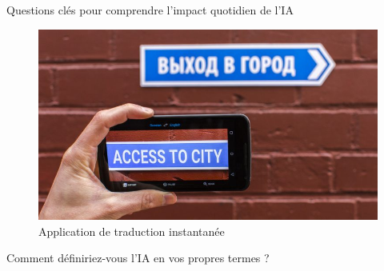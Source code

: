 \documentclass{beamer}
\begin{document}
\begin{frame}{Questions clés pour comprendre l'impact quotidien de l'IA}
\begin{figure}[h]
\begin{minipage}{0.4\textwidth}
				\caption{Resultat de recherche personalisée}
			\end{minipage}\hfill
			\begin{minipage}{0.32\textwidth}
				\centering
				\includegraphics[width=\linewidth]{googlet.jpg}
				\caption{Application de traduction instantanée}
			\end{minipage}
		\end{figure}
		
	\end{frame}	
		
{
	\begin{frame}[plain]{Comment définiriez-vous l'IA en vos propres termes ?}
	\end{frame}
}
\end{document}
